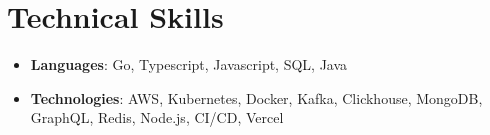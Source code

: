 \section{Technical Skills}
\begin{itemize}[leftmargin=0in, label={}]
    \item \small{\textbf{Languages}}: Go, Typescript, Javascript, SQL, Java
    \vspace{-6pt}
    \item \textbf{Technologies}: AWS, Kubernetes, Docker, Kafka, Clickhouse, MongoDB, GraphQL, Redis, Node.js, CI/CD, Vercel
\end{itemize}
\vspace{-20pt}